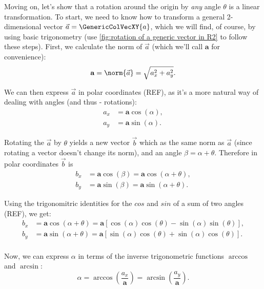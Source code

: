 Moving on, let's show that a rotation around the origin by \textit{any} angle $\theta$ is a linear transformation. To start, we need to know how to transform a general 2-dimensional vector $\vec{a}=\GenericColVecXY{a}$, which we will find, of course, by using basic trigonometry (use \autoref{fig:rotation of a generic vector in R2} to follow these steps). First, we calculate the norm of $\vec{a}$ (which we'll call $\mathbf{a}$ for convenience):
\begin{equation}
	\mathbf{a} = \norm{\vec{a}} = \sqrt{a_{x}^{2}+a_{y}^{2}}.
	\label{eq:norm of a generic 2D vector a}
\end{equation}

We can then express $\vec{a}$ in polar coordinates (REF), as it's a more natural way of dealing with angles (and thus - rotations):
\begin{align}
	a_{x} & = \mathbf{a}\cos(\alpha), \\
	a_{y} & = \mathbf{a}\sin(\alpha).
	\label{eq:vector a in polar coords}
\end{align}

Rotating the $\vec{a}$ by $\theta$ yields a new vector $\vec{b}$ which as the same norm as $\vec{a}$ (since rotating a vector doesn't change its norm), and an angle $\beta=\alpha+\theta$. Therefore in polar coordinates $\vec{b}$ is
\begin{align}
	b_{x} & = \mathbf{a}\cos(\beta) = \mathbf{a}\cos(\alpha+\theta), \\
	b_{y} & = \mathbf{a}\sin(\beta) = \mathbf{a}\sin(\alpha+\theta).
	\label{eq:vector b in polar coords}
\end{align}

Using the trigonomitric identities for the $cos$ and $sin$ of a sum of two angles (REF), we get:
\begin{align}
	b_{x} & = \mathbf{a}\cos(\alpha+\theta) = \mathbf{a}\left[\cos(\alpha)\cos(\theta) - \sin(\alpha)\sin(\theta)\right], \\
	b_{y} & = \mathbf{a}\sin(\alpha+\theta) = \mathbf{a}\left[\sin(\alpha)\cos(\theta) + \sin(\alpha)\cos(\theta)\right]. \\
	\label{eq:vector b in polar coords}
\end{align}

Now, we can express $\alpha$ in terms of the inverse trigonometric functions $\arccos$ and $\arcsin$:
\begin{equation}
	\alpha = \arccos(\frac{a_{x}}{\mathbf{a}}) = \arcsin(\frac{a_{y}}{\mathbf{a}}).
	\label{eq:angle alpha in terms of arccos and arcsin}
\end{equation}

